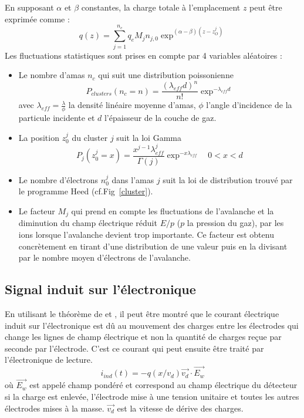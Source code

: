 En supposant $\alpha$ et $\beta$ constantes, la charge totale à l'emplacement $z$ peut être exprimée comme :
\begin{equation}
q(z)=\sum_{j=1}^{n_c}q_{e}M_{j}n_{j,0}\exp^{(\alpha-\beta)(z-z_O^j)}
\end{equation}
\newpage
Les fluctuations statistiques sont prises en compte par \num{4} variables aléatoires :
\begin{itemize}[label=$\bullet$]
	\item Le nombre d'amas $n_c$ qui suit une distribution poissonienne 
	\begin{equation}
	P_{clusters}(n_c=n)=\frac{(\lambda_{eff}d)^{n}}{n!}\exp^{-\lambda_{eff}d}
	\end{equation}
	avec $\lambda_{eff}=\frac{\lambda}{\phi}$ la densité linéaire moyenne d'amas, $\phi$ l'angle d'incidence de la particule incidente et $d$ l'épaisseur de la couche de gaz.
	\item La position $z_0^j$ du cluster $j$ suit la loi Gamma
	\begin{equation}
	P_{j}(z_0^j=x)=\frac{x^{j-1}\lambda_{eff}^{j}}{\Gamma(j)}\exp^{-x\lambda_{eff}} \quad 0<x<d
	\end{equation}
	\item Le nombre d'électrons $n_{0}^{j}$ dans l'amas $j$ suit la loi de distribution trouvé par le programme Heed (cf.Fig~\ref{cluster}).
	\item Le facteur $M_{j}$ qui prend en compte les fluctuations de l'avalanche et la diminution du champ électrique réduit $E/p$ ($p$ la pression du gaz), par les ions lorsque l'avalanche devient trop importante. Ce facteur est obtenu concrètement en tirant d'une distribution de  une valeur puis en la divisant par le nombre moyen d'électrons de l'avalanche.
\end{itemize}
\vspace*{-0.2cm}
\subsection{Signal induit sur l'électronique}
\vspace*{-0.6cm}
En utilisant le théorème de  et  \cite{HE2001250}, il peut être montré que le courant électrique induit sur l'électronique est dû au mouvement des charges entre les électrodes qui change les lignes de champ électrique et non la quantité de charges reçue par seconde par l'électrode. C'est ce courant qui peut ensuite être traité par l'électronique de lecture.
\begin{equation}
i_{ind}(t)=-q(x/v_{d})\vec{v_{d}}\cdot \overrightarrow{E_{w}}
\end{equation}
où $\overrightarrow{E_{w}}$ est appelé champ pondéré et correspond au champ électrique du détecteur si la charge est enlevée, l'électrode mise à une tension unitaire  et toutes les autres électrodes mises à la masse. $\vec{v_{d}}$ est la vitesse de dérive des charges.

